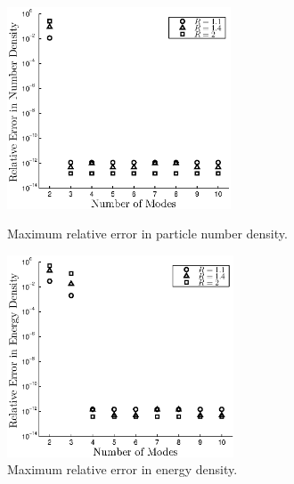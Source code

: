 \begin{figure}[H]
 \begin{minipage}[b]{0.5\linewidth}
\centerline{\includegraphics[height=6.0cm]{03-birrell/SpectralMethodBoltzmann/free_stream_num_err.eps}}
\caption{Maximum relative error in particle number density.}\label{fig:free_stream_num_err}
 \end{minipage}
 \hspace{0.5cm}
 \begin{minipage}[b]{0.5\linewidth}
\centerline{\includegraphics[height=6.0cm]{03-birrell/SpectralMethodBoltzmann/free_stream_E_err.eps}}
\caption{Maximum relative error in energy density.}\label{fig:free_stream_E_err}
 \end{minipage}
 \end{figure}

